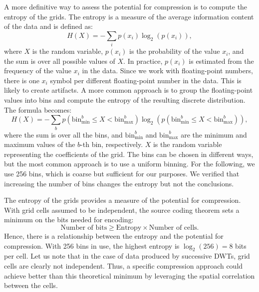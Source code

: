 A more definitive way to assess the potential for compression is to compute the entropy of the grids.
The entropy is a measure of the average information content of the data and is defined as:
\begin{equation}
    \label{eq:entropy_general}
    H(X) = -\sum_{i} p(x_i) \log_2(p(x_i)),
\end{equation}
where $X$ is the random variable, $p(x_i)$ is the probability of the value $x_i$, and the sum is over all possible values of $X$.
In practice, $p(x_i)$ is estimated from the frequency of the value $x_i$ in the data.
Since we work with floating-point numbers, there is one $x_i$ symbol per different floating-point number in the data.
This is likely to create artifacts.
A more common approach is to group the floating-point values into bins and compute the entropy of the resulting discrete distribution.
The formula becomes:
\begin{equation}
    \label{eq:entropy_with_bins}
    H(X) = -\sum_{b} p(\text{bin}^b_{\text{min}} \leq X < \text{bin}^b_{\text{max}}) \log_2(p(\text{bin}^b_{\text{min}} \leq X < \text{bin}^b_{\text{max}})),
\end{equation}
where the sum is over all the bins, and $\text{bin}^b_{\text{min}}$ and $\text{bin}^b_{\text{max}}$ are the minimum and maximum values of the $b$-th bin, respectively.
$X$ is the random variable representing the coefficients of the grid.
The bins can be chosen in different ways, but the most common approach is to use a uniform binning.
For the following, we use 256 bins, which is coarse but sufficient for our purposes.
We verified that increasing the number of bins changes the entropy but not the conclusions.

The entropy of the grids provides a measure of the potential for compression.
With grid cells assumed to be independent, the source coding theorem sets a minimum on the bits needed for encoding:
\begin{equation}
    \label{eq:source_coding_theorem}
    \text{Number of bits} \geq \text{Entropy} \times \text{Number of cells}.
\end{equation}
Hence, there is a relationship between the entropy and the potential for compression.
With 256 bins in use, the highest entropy is $\log_2(256) = 8$ bits per cell.
Let us note that in the case of data produced by successive DWTs, grid cells are clearly not independent.
Thus, a specific compression approach could achieve better than this theoretical minimum by leveraging the spatial correlation between the cells.

